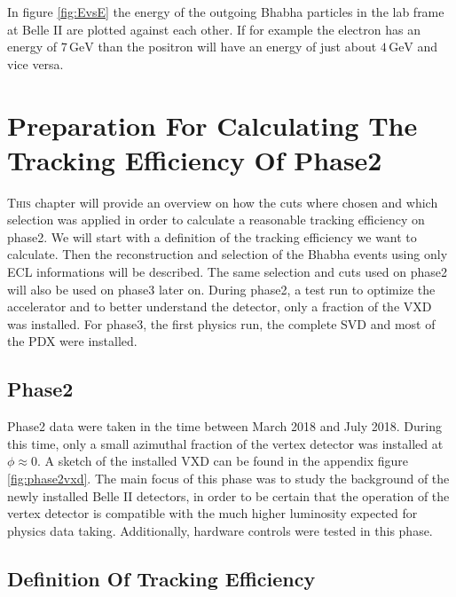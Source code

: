 \documentclass[a4paper,11pt,twosided,final,german,openbib,pdftex,listof=totoc,bibliography=totoc]{scrbook}
\begin{document}
In figure \ref{fig:EvsE} the energy of the outgoing Bhabha particles in the lab frame at Belle II are plotted against each other. If for example the electron has an energy of $7\,\textrm{GeV}$ than the positron will have an energy of just about $4\,\textrm{GeV}$ and vice versa.












\chapter{Preparation  For Calculating The Tracking Efficiency Of Phase2}
\label{chap:Phase2Eff}

\lettrine{T}{his} chapter will provide an overview on how the cuts where chosen and which selection was applied in order to calculate a reasonable tracking efficiency on phase2.
We will start with a definition of the tracking efficiency we want to calculate. Then the reconstruction and selection of the Bhabha events using only ECL informations will be described. The same selection and cuts used on phase2 will also be used on phase3 later on.
During phase2, a test run to optimize the accelerator and to better understand the detector, only a fraction of the VXD was installed. For phase3, the first physics run, the complete SVD and most of the PDX were installed.

\section{Phase2}
\label{sec:Phase2}

Phase2 data were taken in the time between March 2018 and July 2018. During this time, only a small azimuthal fraction of the vertex detector was installed at $\phi \approx 0$. A sketch of the installed VXD can be found in the appendix figure \ref{fig:phase2vxd}. The main focus of this phase was to study the background of the newly installed Belle II detectors, in order to be certain that the operation of the vertex detector is compatible with the much higher luminosity expected for physics data taking. Additionally, hardware controls were tested in this phase.


\section{Definition Of Tracking Efficiency}
\label{sec:Eff}
\end{document}
